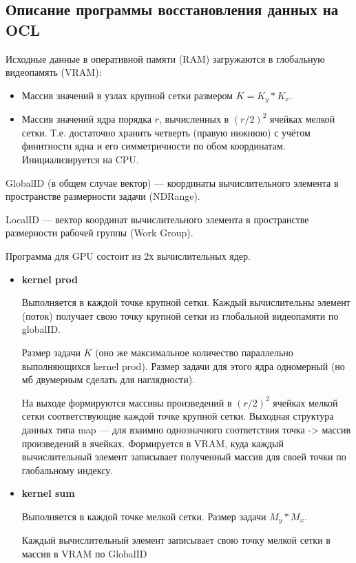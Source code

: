 

\label{sec:OCLprog}


\subsection*{Описание программы восстановления данных на OCL}

Исходные данные в оперативной памяти (RAM)
загружаются в глобальную видеопамять (VRAM):
\begin{itemize}
\item
  Массив значений в узлах крупной сетки размером $K = K_y*K_x$.
\item
  Массив значений ядра порядка $r$, вычисленных в
  $(r/2)^2$ ячейках мелкой сетки. Т.е. достаточно хранить
  четверть (правую нижнюю) с учётом финитности ядна и его симметричности по
  обом координатам.
  Инициализируется на CPU.
\end{itemize}

GlobalID (в общем случае вектор) --- координаты вычислительного элемента в пространстве размерности задачи (NDRange).

LocalID --- вектор координат вычислительного элемента в пространстве размерности рабочей группы (Work Group).

Программа для GPU состоит из 2х вычислительных ядер.
\begin{itemize}
\item
  {\bf kernel prod}

  Выполняется в каждой точке крупной сетки.
  Каждый вычислительны элемент (поток)
  получает свою точку крупной сетки
  из глобальной видеопамяти по globalID. 
  
  Размер задачи $K$ (оно же
  максимальное количество параллельно выполняющихся kernel prod).
  Размер задачи для этого ядра одномерный (но мб двумерным сделать для наглядности).

  На выходе формируются массивы произведений в $(r/2)^2$ ячейках мелкой сетки  
  соответствующие каждой точке крупной сетки.
  Выходная структура данных типа map --- для взаимно однозначного соответствия точка -> массив произведений в ячейках.
  Формируется в VRAM, куда каждый вычислительный элемент записывает полученный массив для своей точки по
  глобальному индексу.
  
\item
  {\bf kernel sum}

  Выполняется в каждой точке мелкой сетки.
  Размер задачи $M_y * M_x$.

  
  Каждый вычислительный элемент записывает свою точку мелкой сетки в
  массив в VRAM по GlobalID
\end{itemize}






